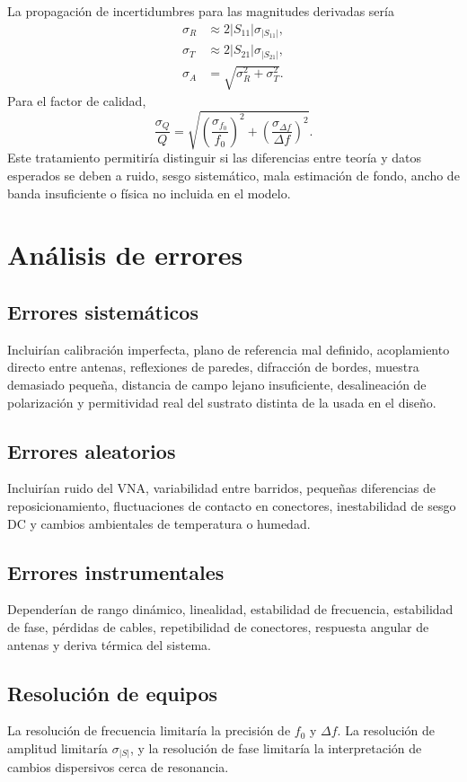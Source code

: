 \documentclass[12pt,a4paper]{article}
\begin{document}
La propagación de incertidumbres para las magnitudes derivadas sería
\begin{align}
  \sigma_R &\approx 2|S_{11}|\sigma_{|S_{11}|}, \\
  \sigma_T &\approx 2|S_{21}|\sigma_{|S_{21}|}, \\
  \sigma_A &= \sqrt{\sigma_R^2+\sigma_T^2}.
\end{align}
Para el factor de calidad,
\begin{equation}
  \frac{\sigma_Q}{Q}=\sqrt{\left(\frac{\sigma_{f_0}}{f_0}\right)^2+\left(\frac{\sigma_{\Delta f}}{\Delta f}\right)^2}.
\end{equation}
Este tratamiento permitiría distinguir si las diferencias entre teoría y datos esperados se deben a ruido, sesgo sistemático, mala estimación de fondo, ancho de banda insuficiente o física no incluida en el modelo.

\section{Análisis de errores}

\subsection*{Errores sistemáticos}
Incluirían calibración imperfecta, plano de referencia mal definido, acoplamiento directo entre antenas, reflexiones de paredes, difracción de bordes, muestra demasiado pequeña, distancia de campo lejano insuficiente, desalineación de polarización y permitividad real del sustrato distinta de la usada en el diseño.

\subsection*{Errores aleatorios}
Incluirían ruido del VNA, variabilidad entre barridos, pequeñas diferencias de reposicionamiento, fluctuaciones de contacto en conectores, inestabilidad de sesgo DC y cambios ambientales de temperatura o humedad.

\subsection*{Errores instrumentales}
Dependerían de rango dinámico, linealidad, estabilidad de frecuencia, estabilidad de fase, pérdidas de cables, repetibilidad de conectores, respuesta angular de antenas y deriva térmica del sistema.

\subsection*{Resolución de equipos}
La resolución de frecuencia limitaría la precisión de \(f_0\) y \(\Delta f\). La resolución de amplitud limitaría \(\sigma_{|S|}\), y la resolución de fase limitaría la interpretación de cambios dispersivos cerca de resonancia.
\end{document}
